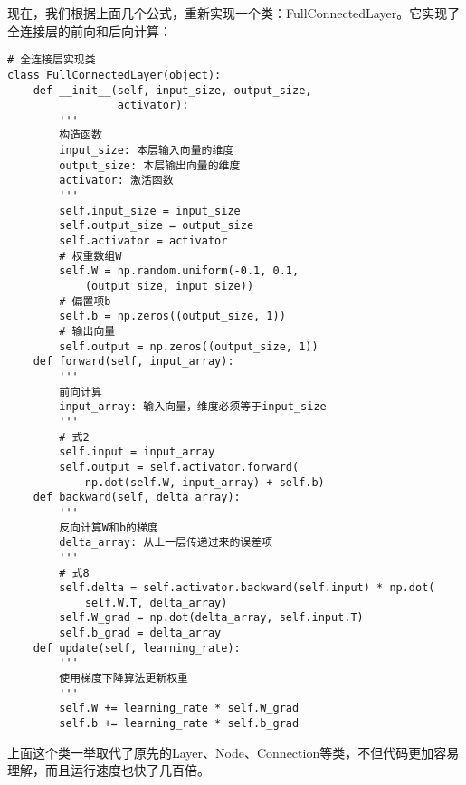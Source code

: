 现在，我们根据上面几个公式，重新实现一个类：FullConnectedLayer。它实现了全连接层的前向和后向计算：
\begin{lstlisting}
# 全连接层实现类
class FullConnectedLayer(object):
    def __init__(self, input_size, output_size, 
                 activator):
        '''
        构造函数
        input_size: 本层输入向量的维度
        output_size: 本层输出向量的维度
        activator: 激活函数
        '''
        self.input_size = input_size
        self.output_size = output_size
        self.activator = activator
        # 权重数组W
        self.W = np.random.uniform(-0.1, 0.1,
            (output_size, input_size))
        # 偏置项b
        self.b = np.zeros((output_size, 1))
        # 输出向量
        self.output = np.zeros((output_size, 1))
    def forward(self, input_array):
        '''
        前向计算
        input_array: 输入向量，维度必须等于input_size
        '''
        # 式2
        self.input = input_array
        self.output = self.activator.forward(
            np.dot(self.W, input_array) + self.b)
    def backward(self, delta_array):
        '''
        反向计算W和b的梯度
        delta_array: 从上一层传递过来的误差项
        '''
        # 式8
        self.delta = self.activator.backward(self.input) * np.dot(
            self.W.T, delta_array)
        self.W_grad = np.dot(delta_array, self.input.T)
        self.b_grad = delta_array
    def update(self, learning_rate):
        '''
        使用梯度下降算法更新权重
        '''
        self.W += learning_rate * self.W_grad
        self.b += learning_rate * self.b_grad
\end{lstlisting}


上面这个类一举取代了原先的Layer、Node、Connection等类，不但代码更加容易理解，而且运行速度也快了几百倍。

